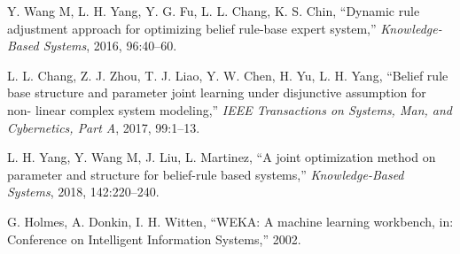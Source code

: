 \documentclass{ieeeaccess}
\begin{document}
\begin{thebibliography}{00}
     Y. Wang M, L. H. Yang, Y. G. Fu, L. L. Chang, K. S. Chin, ``Dynamic rule adjustment approach for optimizing belief rule-base expert system,''
    \emph{Knowledge-Based Systems}, 2016, 96:40–60.

     L. L. Chang, Z. J. Zhou, T. J. Liao, Y. W. Chen, H. Yu, L. H. Yang, ``Belief rule base structure and parameter joint learning under disjunctive assumption for non- linear complex system modeling,''
    \emph{IEEE Transactions on Systems, Man, and Cybernetics, Part A}, 2017, 99:1–13.

     L. H. Yang, Y. Wang M, J. Liu, L. Martinez, ``A joint optimization method on parameter and structure for belief-rule based systems,''
    \emph{Knowledge-Based Systems}, 2018, 142:220–240.

     G. Holmes, A. Donkin, I. H. Witten, ``WEKA: A machine learning workbench,
    in: Conference on Intelligent Information Systems,'' 2002.

\end{thebibliography}
\end{document}

